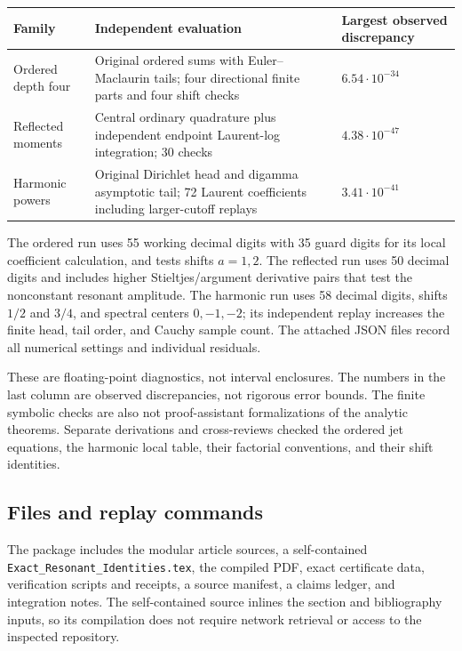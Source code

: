 \documentclass[11pt,a4paper]{article}
\numberwithin{equation}{section}
\theoremstyle{definition}
\theoremstyle{remark}
\newcommand{\src}[1]{\nolinkurl{#1}}
\begin{document}
\begin{center}
\begin{tabular}{@{}p{}p{}p{}@{}}
\toprule
Family & Independent evaluation & Largest observed discrepancy\\
\midrule
Ordered depth four & Original ordered sums with Euler--Maclaurin tails;
four directional finite parts and four shift checks &
$6.54\cdot10^{-34}$\\[5pt]
Reflected moments & Central ordinary quadrature plus independent
endpoint Laurent-log integration; 30 checks &
$4.38\cdot10^{-47}$\\[5pt]
Harmonic powers & Original Dirichlet head and digamma asymptotic tail;
72 Laurent coefficients including larger-cutoff replays &
$3.41\cdot10^{-41}$\\
\bottomrule
\end{tabular}
\end{center}

The ordered run uses 55 working decimal digits with 35 guard digits
for its local coefficient calculation, and tests shifts $a=1,2$.
The reflected run uses 50 decimal digits and includes higher
Stieltjes/argument derivative pairs that test the nonconstant resonant
amplitude. The harmonic run uses 58 decimal digits, shifts $1/2$ and
$3/4$, and spectral centers $0,-1,-2$; its independent replay increases
the finite head, tail order, and Cauchy sample count. The attached JSON
files record all numerical settings and individual residuals.

These are floating-point diagnostics, not interval enclosures. The
numbers in the last column are observed discrepancies, not rigorous
error bounds. The finite symbolic checks are also not proof-assistant
formalizations of the analytic theorems. Separate derivations and
cross-reviews checked the ordered jet equations, the harmonic local
table, their factorial conventions, and their shift identities.

\subsection{Files and replay commands}

The package includes the modular article sources, a self-contained
\src{Exact_Resonant_Identities.tex}, the compiled PDF, exact certificate
data, verification scripts and receipts, a source manifest, a claims
ledger, and integration notes. The self-contained source inlines the
section and bibliography inputs, so its compilation does not require
network retrieval or access to the inspected repository.
\end{document}
